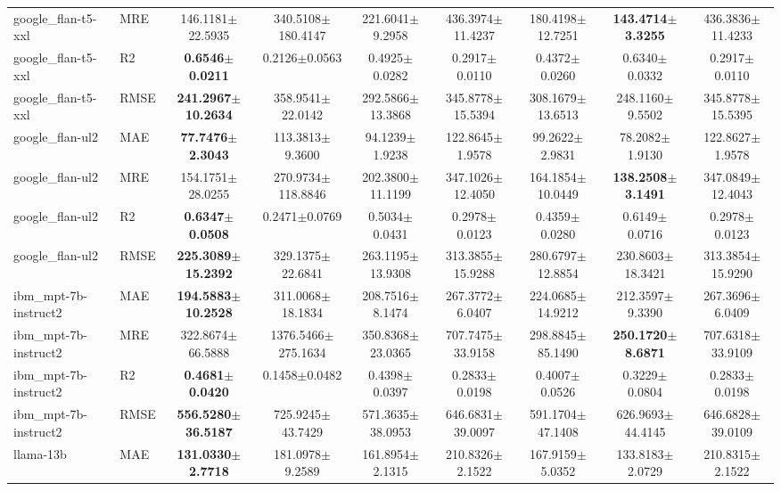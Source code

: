 \begin{table}[t]
\begin{tabular}{llccccccc}
google\_flan-t5-xxl & MRE & 146.1181$\pm$22.5935 & 340.5108$\pm$180.4147 & 221.6041$\pm$9.2958 & 436.3974$\pm$11.4237 & 180.4198$\pm$12.7251 & \textbf{143.4714$\pm$3.3255} & 436.3836$\pm$11.4233 \\
google\_flan-t5-xxl & R2 & \textbf{0.6546$\pm$0.0211} & 0.2126$\pm$0.0563 & 0.4925$\pm$0.0282 & 0.2917$\pm$0.0110 & 0.4372$\pm$0.0260 & 0.6340$\pm$0.0332 & 0.2917$\pm$0.0110 \\
google\_flan-t5-xxl & RMSE & \textbf{241.2967$\pm$10.2634} & 358.9541$\pm$22.0142 & 292.5866$\pm$13.3868 & 345.8778$\pm$15.5394 & 308.1679$\pm$13.6513 & 248.1160$\pm$9.5502 & 345.8778$\pm$15.5395 \\
\addlinespace
google\_flan-ul2 & MAE & \textbf{77.7476$\pm$2.3043} & 113.3813$\pm$9.3600 & 94.1239$\pm$1.9238 & 122.8645$\pm$1.9578 & 99.2622$\pm$2.9831 & 78.2082$\pm$1.9130 & 122.8627$\pm$1.9578 \\
google\_flan-ul2 & MRE & 154.1751$\pm$28.0255 & 270.9734$\pm$118.8846 & 202.3800$\pm$11.1199 & 347.1026$\pm$12.4050 & 164.1854$\pm$10.0449 & \textbf{138.2508$\pm$3.1491} & 347.0849$\pm$12.4043 \\
google\_flan-ul2 & R2 & \textbf{0.6347$\pm$0.0508} & 0.2471$\pm$0.0769 & 0.5034$\pm$0.0431 & 0.2978$\pm$0.0123 & 0.4359$\pm$0.0280 & 0.6149$\pm$0.0716 & 0.2978$\pm$0.0123 \\
google\_flan-ul2 & RMSE & \textbf{225.3089$\pm$15.2392} & 329.1375$\pm$22.6841 & 263.1195$\pm$13.9308 & 313.3855$\pm$15.9288 & 280.6797$\pm$12.8854 & 230.8603$\pm$18.3421 & 313.3854$\pm$15.9290 \\
\addlinespace
ibm\_mpt-7b-instruct2 & MAE & \textbf{194.5883$\pm$10.2528} & 311.0068$\pm$18.1834 & 208.7516$\pm$8.1474 & 267.3772$\pm$6.0407 & 224.0685$\pm$14.9212 & 212.3597$\pm$9.3390 & 267.3696$\pm$6.0409 \\
ibm\_mpt-7b-instruct2 & MRE & 322.8674$\pm$66.5888 & 1376.5466$\pm$275.1634 & 350.8368$\pm$23.0365 & 707.7475$\pm$33.9158 & 298.8845$\pm$85.1490 & \textbf{250.1720$\pm$8.6871} & 707.6318$\pm$33.9109 \\
ibm\_mpt-7b-instruct2 & R2 & \textbf{0.4681$\pm$0.0420} & 0.1458$\pm$0.0482 & 0.4398$\pm$0.0397 & 0.2833$\pm$0.0198 & 0.4007$\pm$0.0526 & 0.3229$\pm$0.0804 & 0.2833$\pm$0.0198 \\
ibm\_mpt-7b-instruct2 & RMSE & \textbf{556.5280$\pm$36.5187} & 725.9245$\pm$43.7429 & 571.3635$\pm$38.0953 & 646.6831$\pm$39.0097 & 591.1704$\pm$47.1408 & 626.9693$\pm$44.4145 & 646.6828$\pm$39.0109 \\
\addlinespace
llama-13b & MAE & \textbf{131.0330$\pm$2.7718} & 181.0978$\pm$9.2589 & 161.8954$\pm$2.1315 & 210.8326$\pm$2.1522 & 167.9159$\pm$5.0352 & 133.8183$\pm$2.0729 & 210.8315$\pm$2.1522 \\

\end{tabular}
\end{table}
